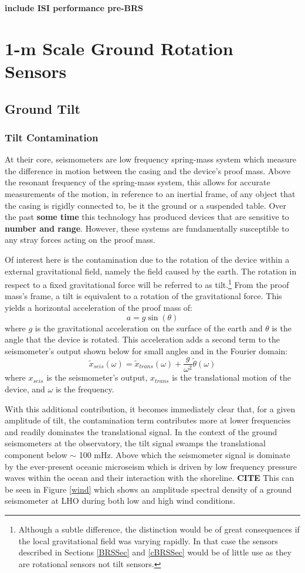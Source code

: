 \documentclass [12pt, proquest]{uwthesis}[2019]
\begin{document}
\textbf{include ISI performance pre-BRS}

\chapter{1-m Scale Ground Rotation Sensors} \label{BRS_chap}
\section{Ground Tilt}\label{tilt}
\subsection{Tilt Contamination}\label{tiltCon}
\quad At their core, seismometers are low frequency spring-mass system which measure the difference in motion between the casing and the device's proof mass. Above the resonant frequency of the spring-mass system, this allows for accurate measurements of the motion, in reference to an inertial frame, of any object that the casing is rigidly connected to, be it the ground or a suspended table. Over the past \textbf{some time} this technology has produced devices that are sensitive to \textbf{number and range}. However, these systems are fundamentally susceptible to any stray forces acting on the proof mass.

Of interest here is the contamination due to the rotation of the device within a external gravitational field, namely the field caused by the earth. The rotation in respect to a fixed gravitational force will be referred to as tilt.\footnote{Although a subtle difference, the distinction would be of great consequences if the local gravitational field was varying rapidly. In that case the sensors described in Sections \ref{BRSSec} and \ref{cBRSSec} would be of little use as they are rotational sensors not tilt sensors.} From the proof mass's frame, a tilt is equivalent to a rotation of the gravitational force. This yields a horizontal acceleration of the proof mass of:
\[ a=g \sin(\theta)\]
where $g$ is the gravitational acceleration on the surface of the earth and $\theta$ is the angle that the device is rotated. This acceleration adds a second term to the seismometer's output shown below for small angles and in the Fourier domain:
\[\tilde{x}_{seis}(\omega)=\tilde{x}_{trans}(\omega)+\frac{g}{\omega^2}\tilde{\theta}(\omega)\]
where $x_{seis}$ is the seismometer's output, $x_{trans}$ is the translational motion of the device, and $\omega$ is the frequency. 

With this additional contribution, it becomes immediately clear that, for a given amplitude of tilt, the contamination term contributes more at lower frequencies and readily dominates the translational signal. In the context of the ground seismometers at the observatory, the tilt signal swamps the translational component below $\sim$ 100 mHz. Above which the seismometer signal is dominate by the ever-present oceanic microseism which is driven by low frequency pressure waves within the ocean and their interaction with the shoreline. \textbf{CITE} This can be seen in Figure \ref{wind} which shows an amplitude spectral density of a ground seismometer at LHO during both low and high wind conditions.
\end{document}
